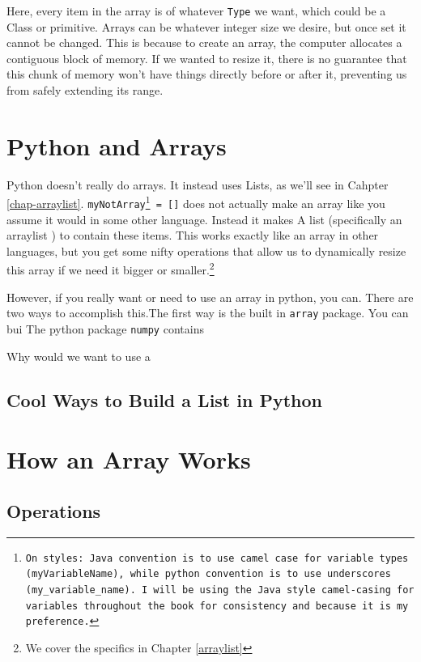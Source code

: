 \documentclass[10pt,a4paper]{book}
\begin{document}
Here, every item in the array is of whatever \texttt{Type} we want, which could be a Class or primitive.   
Arrays can be whatever integer size we desire, but once set it cannot be changed.
This is because to create an array, the computer allocates a contiguous block of memory.
If we wanted to resize it, there is no guarantee that this chunk of memory won't have things directly before or after it, preventing us from safely extending its range.

\section{Python and Arrays}
Python doesn't really do arrays.
It instead uses Lists, as we'll see in Cahpter \ref{chap-arraylist}.
\texttt{myNotArray\footnote{On styles:  Java convention is to use camel case for variable types (\texttt{myVariableName}), while python convention is to use underscores (\texttt{my\_variable\_name}).  I will be using the Java style camel-casing for variables throughout the book for consistency and because it is my preference.} = []} does not actually make an array like you assume it would in some other language.  Instead it makes A list (specifically an arraylist ) to contain these items.
This works exactly like an array in other languages, but you get some nifty operations that allow us to dynamically resize this array if we need it bigger or smaller.\footnote{We cover the specifics in Chapter \ref{arraylist}}



However, if you really want or need to use an array in python, you can.
There are two ways to accomplish this.The first way is the built in \texttt{array} package.  You can bui  The python package \texttt{numpy} contains

Why would we want to use a 


\subsection{Cool Ways to Build a List in Python}







\section{How an Array Works}


\subsection{Operations}
\end{document}
